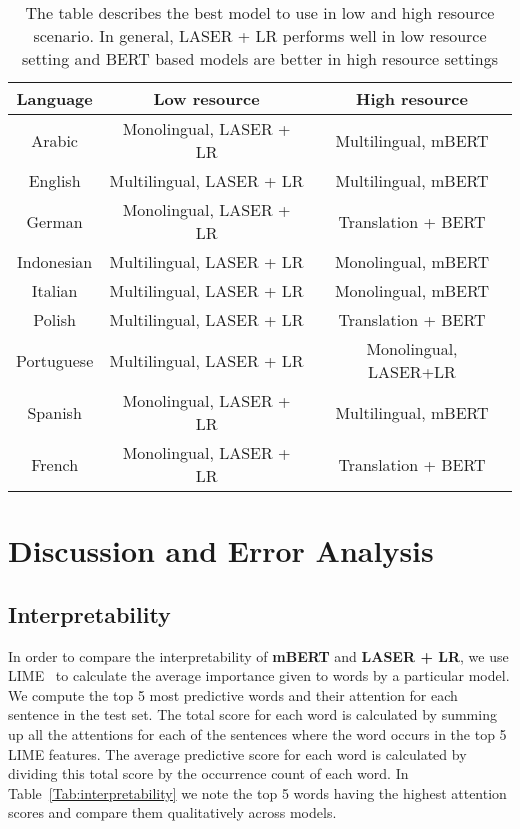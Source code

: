 \documentclass[runningheads]{llncs}
\begin{document}
\begin{table}[!htb]
\centering
\caption{The table describes the best model to use in low and high resource scenario. In general, LASER + LR performs well in low resource setting and BERT based models are better in high resource settings}
\label{tab:recipe}
\begin{tabular}{c cc}
\hline
\textbf{Language} & \textbf{Low resource}  & \textbf{High resource} \\ \hline
Arabic            & Monolingual, LASER + LR  & Multilingual, mBERT    \\
English           & Multilingual, LASER + LR & Multilingual, mBERT    \\
German            & Monolingual, LASER + LR  & Translation + BERT     \\
Indonesian        &Multilingual, LASER + LR  & Monolingual, mBERT     \\
Italian           & Multilingual, LASER + LR  & Monolingual, mBERT     \\
Polish            &  Multilingual, LASER + LR & Translation + BERT     \\
Portuguese         & Multilingual, LASER + LR & Monolingual, LASER+LR  \\
Spanish           & Monolingual, LASER + LR  & Multilingual, mBERT    \\
French            & Monolingual, LASER + LR  & Translation + BERT     \\ \hline
\end{tabular}
\end{table}






\section{Discussion and Error Analysis}\label{sec:discussion}

\subsection{Interpretability}

 In order to compare the interpretability of \textbf{mBERT} and \textbf{LASER + LR}, we use LIME~\cite{ribeiro2016should} to calculate the average importance given to words by a particular model. We compute the top 5 most predictive words and their attention for each sentence in the test set. The total score for each word is calculated by summing up all the attentions for each of the sentences where the word occurs in the top 5 LIME features. The average predictive score for each word is calculated by dividing this total score by the occurrence count of each word. In Table~\ref{Tab:interpretability} we note the top 5 words having the highest attention scores and compare them qualitatively across models. 
\end{document}

